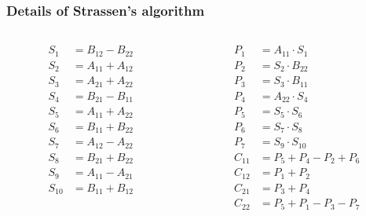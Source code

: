 \documentclass[10pt,aspectratio=169]{beamer}
\begin{document}
\begin{frame} \frametitle{Details of Strassen's algorithm}
  \begin{columns}
  \begin{column}{0.5\textwidth}
    \begin{align*}
      S_1    &= B_{12} - B_{22} \\
      S_2    &= A_{11} + A_{12} \\
      S_3    &= A_{21} + A_{22} \\
      S_4    &= B_{21} - B_{11} \\
      S_5    &= A_{11} + A_{22} \\
      S_6    &= B_{11} + B_{22} \\
      S_7    &= A_{12} - A_{22} \\
      S_8    &= B_{21} + B_{22} \\
      S_9    &= A_{11} - A_{21} \\
      S_{10} &= B_{11} + B_{12} \\
    \end{align*}
  \end{column}
  \begin{column}{0.5\textwidth}
    \begin{align*}
      P_1 &= A_{11} \cdot S_1 \\
      P_2 &= S_2 \cdot B_{22} \\
      P_3 &= S_3 \cdot B_{11} \\
      P_4 &= A_{22} \cdot S_4 \\
      P_5 &= S_5 \cdot S_6 \\
      P_6 &= S_7 \cdot S_8 \\
      P_7 &= S_9 \cdot S_{10} \\
      C_{11} &= P_5 + P_4 - P_2 + P_6 \\
      C_{12} &= P_1 + P_2 \\
      C_{21} &= P_3 + P_4 \\
      C_{22} &= P_5 + P_1 - P_3 - P_7 \\
    \end{align*}
  \end{column}
 \end{columns}
\end{frame}
\end{document}
